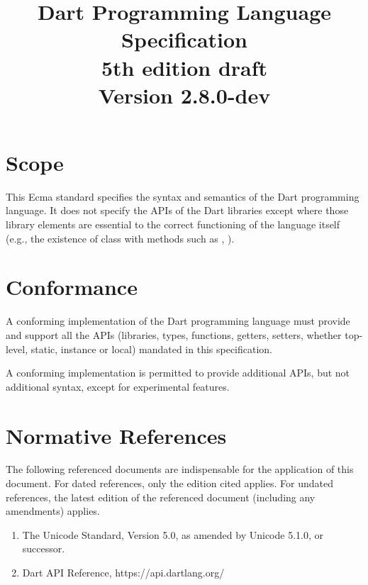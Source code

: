\documentclass[makeidx]{article}
\title{Dart Programming Language Specification\\
{5th edition draft}\\
{\large Version 2.8.0-dev}}
\author{}
\begin{document}
\maketitle
\tableofcontents

\newpage

\pagestyle{myheadings}


\section{Scope}

\LMHash{}%
This Ecma standard specifies the syntax and semantics of the Dart programming language.
It does not specify the APIs of the Dart libraries except where those library elements are essential to the correct functioning of the language itself (e.g., the existence of class  with methods such as , ).


\section{Conformance}

\LMHash{}%
A conforming implementation of the Dart programming language must provide and support all the APIs (libraries, types, functions, getters, setters, whether top-level, static, instance or local) mandated in this specification.

\LMHash{}%
A conforming implementation is permitted to provide additional APIs,
but not additional syntax,
except for experimental features.


\section{Normative References}

\LMHash{}%
The following referenced documents are indispensable for the application of this document.
For dated references, only the edition cited applies.
For undated references, the latest edition of the referenced document (including any amendments) applies.

\begin{enumerate}
\item
  The Unicode Standard, Version 5.0, as amended by Unicode 5.1.0, or successor.
\item
  Dart API Reference, https://api.dartlang.org/
\end{enumerate}
\end{document}
